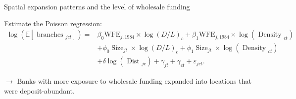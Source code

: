 \documentclass[notes,10pt, aspectratio=169]{beamer}
\newenvironment{wideitemize}{\itemize\addtolength{\itemsep}{10pt}}{\enditemize}
\begin{document}
        \begin{frame}{Spatial expansion patterns and the level of wholesale funding         \hyperlink{mismatch_sorting}{}}\label{mismatch_sorting3}
    
        \begin{wideitemize}
            \item
     Estimate the Poisson regression:
            $$
            \begin{aligned}
            \log \left(\mathbb{E}\left[\text { branches }_{j c t}\right]\right)= & \beta_0 \mathrm{WFE}_{j, 1984} \times \log (D / L)_c+\beta_1 \mathrm{WFE}_{j, 1984} \times \log \left(\text { Density }_{c t}\right) \\
            & +\phi_0 \operatorname{Size}_{j t} \times \log (D / L)_c+\phi_1 \operatorname{Size}_{j t} \times \log \left(\text { Density }_{c t}\right) \\
            & +\delta \log \left(\text { Dist }_{j c}\right)+\gamma_{j t}+\gamma_{c t}+\varepsilon_{j c t} .
            \end{aligned}
            $$
            
    
            \item[$\rightarrow$] Banks with more exposure to wholesale funding expanded into locations that were deposit-abundant. %
        \end{wideitemize}
            
    
        
        \end{frame}
    
    
    
\end{document}
